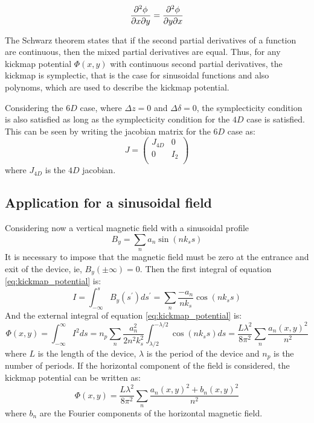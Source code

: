 \documentclass[a4paper,12pt]{article}
\begin{document}
\begin{equation}
    \frac{\partial^2\phi}{\partial x \partial y} = \frac{\partial^2 \phi}{\partial y \partial x} \\
    \label{eq:symplecticity_condition_kickmap}
\end{equation}

The Schwarz theorem states that if the second partial derivatives of a function are continuous, then the mixed partial derivatives are equal.
Thus, for any kickmap potential $\Phi(x, y)$ with continuous second partial derivatives, the kickmap is symplectic, that is the case for 
sinusoidal functions and also polynoms, which are used to describe the kickmap potential.

Considering the $6D$ case, where $\Delta z = 0$ and $\Delta \delta = 0$, the symplecticity condition is also satisfied as long as
the symplecticity condition for the $4D$ case is satisfied. This can be seen by writing the jacobian matrix for the $6D$ case as:
\begin{equation}
    J = \begin{pmatrix}
        J_{4D} & 0 \\
        0 & I_2 \\
    \end{pmatrix}
\end{equation}
where $J_{4D}$ is the $4D$ jacobian. 

\subsection{Application for a sinusoidal field}

Considering now a vertical magnetic field with a sinusoidal profile
\begin{equation}
    B_y = \sum_{n} a_n \sin(n k_s s)
    \label{eq:sinusoidal_field}
\end{equation}
It is necessary to impose that the magnetic field must be zero at the entrance and exit of the device, ie, $B_y(\pm \infty) = 0$.
Then the first integral of equation \eqref{eq:kickmap_potential} is:
\begin{equation}
    I = \int_{-\infty}^{s}B_y(s^{\prime})ds^{\prime} = \sum_{n}\frac{-a_n}{nk_s}\cos(n k_s s)
    \label{eq:first_integral_sinusoidal}
\end{equation}
And the external integral of equation \eqref{eq:kickmap_potential} is:
\begin{equation}
    \Phi(x, y) = \int_{-\infty}^{\infty} I^2 ds = n_p \sum_{n}\frac{a_n^2}{2 n^2 k_s^2}\int_{\lambda/2}^{-\lambda/2}\cos(n k_s s)ds =
     \frac{L \lambda^2}{8\pi^2}\sum_{n}\frac{a_n(x, y)^2}{n^2}
    \label{eq:kickmap_potential_sinusoidal}
\end{equation}
where $L$ is the length of the device, $\lambda$ is the period of the device and $n_p$ is the number of periods.
If the horizontal component of the field is considered, the kickmap potential can be written as:
\begin{equation}
    \Phi(x, y) = \frac{L \lambda^2}{8\pi^2}\sum_{n}\frac{a_n(x, y)^2 + b_n(x, y)^2}{n^2}
    \label{eq:kickmap_potential_sinusoidal_2D}
\end{equation}
where $b_n$ are the Fourier components of the horizontal magnetic field.
\end{document}
